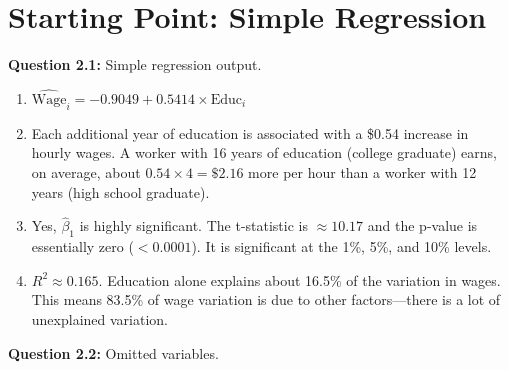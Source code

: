 \documentclass[11pt,letterpaper]{article}
\begin{document}
\section{Starting Point: Simple Regression}

\textbf{Question 2.1:} Simple regression output.

\begin{answer}
\begin{enumerate}[label=(\alph*)]
\item $\widehat{\text{Wage}}_i = -0.9049 + 0.5414 \times \text{Educ}_i$

\item Each additional year of education is associated with a \$0.54 increase in hourly wages. A worker with 16 years of education (college graduate) earns, on average, about $0.54 \times 4 = \$2.16$ more per hour than a worker with 12 years (high school graduate).

\item Yes, $\hat{\beta}_1$ is highly significant. The t-statistic is $\approx 10.17$ and the p-value is essentially zero ($< 0.0001$). It is significant at the 1\%, 5\%, and 10\% levels.

\item $R^2 \approx 0.165$. Education alone explains about 16.5\% of the variation in wages. This means 83.5\% of wage variation is due to other factors---there is a lot of unexplained variation.
\end{enumerate}
\end{answer}

\textbf{Question 2.2:} Omitted variables.
\end{document}
